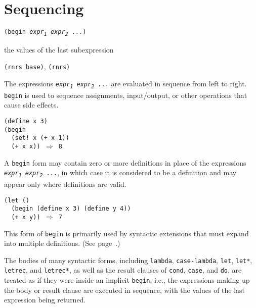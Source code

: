 \section{\label{control_g98}\label{control_h2}Sequencing\label{control_SECTSEQUENCING}}


\begin{description}

\label{control_s4}\item[syntax] \texttt{(begin \textit{expr\textsubscript{1}} \textit{expr\textsubscript{2}} ...)}



\item[returns] the values of the last subexpression


\item[libraries] \texttt{(rnrs base)}, \texttt{(rnrs)}
\end{description}


The expressions \texttt{\textit{expr\textsubscript{1}} \textit{expr\textsubscript{2}} ...} are evaluated in sequence
from left to right.
\label{control_s5}\texttt{begin} is used to sequence assignments,
input/output, or other operations that cause \label{control_s6}side effects.


\begin{alltt}
(define x 3)
(begin
  (set! x (+ x 1))
  (+ x x)) \(\Rightarrow\) 8
\end{alltt}


A \texttt{begin} form may contain zero or more definitions in place of
the expressions \texttt{\textit{expr\textsubscript{1}} \textit{expr\textsubscript{2}} ...}, in which case
it is considered to be a definition and may appear only where definitions
are valid.


\begin{alltt}
(let ()
  (begin (define x 3) (define y 4))
  (+ x y)) \(\Rightarrow\) 7
\end{alltt}


This form of \texttt{begin} is primarily used by syntactic extensions
that must expand into multiple definitions.
(See page \pageref{binding_multi_define_syntax}.)


The bodies of many syntactic forms, including \texttt{lambda}, \texttt{case-lambda}, \texttt{let},
\texttt{let*}, \texttt{letrec}, and \texttt{letrec*}, as well as the result clauses of \texttt{cond},
\texttt{case}, and \texttt{do}, are treated as if they
were inside an \label{control_s7}implicit \texttt{begin}; i.e., the expressions
making up the body or result clause are executed in sequence, with the values of the
last expression being returned.



